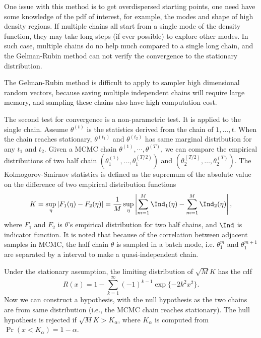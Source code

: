 \documentclass[12pt]{article}
\begin{document}
One issue with this method is to get overdispersed starting points, one need have
some knowledge of the pdf of interest, for example, the modes and shape of high
density regions. If multiple chains all start from a single mode of the density
function, they may take long steps (if ever possible) to explore other modes. In
such case, multiple chains do no help much compared to a single long chain, and
the Gelman-Rubin method can not verify the convergence to the stationary
distribution.


The Gelman-Rubin method is difficult to apply to sampler high dimensional random
vectors, because saving multiple independent chains will require large memory,
and sampling these chains also have high computation cost.

The second test for convergence is a non-parametric test. It is applied to the
single chain. Assume $\theta^{(t)}$ is the statistics derived from the chain of
$1, \dots, t$. When the chain reaches stationary, $\theta^{(t_1)}$ and
$\theta^{(t_2)}$ has same marginal distribution for any $t_1$ and $t_2$. Given a
MCMC chain $\theta^{(1)}, \cdots, \theta^{(T)}$, we can compare the empirical
distributions of two half chain $(\theta_1^{(1)}, \dots, \theta_1^{(T/2)})$ and
$(\theta_2^{(T/2)}, \dots, \theta_2^{(T)})$. The Kolmogorov-Smirnov statistics
is defined as the supremum of the absolute value on the difference of two
empirical distribution functions
\begin{equation*}
  K   = \sup_{\eta} | F_1(\eta) - F_2(\eta) | = \frac{1}{M}\sup_{\eta} \left | \sum_{m=1}^M \Ind_1(\eta) - \sum_{m=1}^M \Ind_2(\eta)\right |,
\end{equation*}
where $F_1$ and $F_2$ is $\theta$'s empirical distribution for two half chains,
and $\Ind$ is indicator function. It is noted that because of the correlation
between adjacent samples in MCMC, the half chain $\theta$ is sampled in a batch
mode, i.e. $\theta_1^m$ and $\theta_1^{m+1}$ are separated by a interval to make
a quasi-independent chain. 

Under the stationary assumption, the limiting distribution of $\sqrt{M}K$ has
the cdf \citep[chap 12.2] {robert2004monte}
\begin{equation*}
  R(x) = 1 - \sum_{k=1}^{\infty} (-1)^{k-1} \exp \{ -2 k^2 x^2\}.
\end{equation*}
Now we can construct a hypothesis, with the null hypothesis as the two chains
are from same distribution (i.e., the MCMC chain reaches stationary). The hull
hypothesis is rejected if $\sqrt{M}K > K_{\alpha}$, where $K_{\alpha}$ is
computed from $\Pr(x < K_{\alpha}) = 1 - \alpha$.
\end{document}
